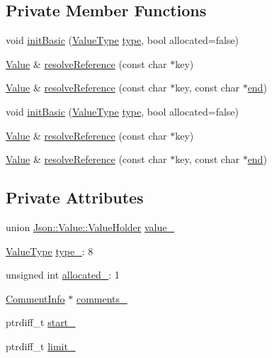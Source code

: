 \subsection*{Private Member Functions}
\begin{DoxyCompactItemize}
\item 
void \hyperlink{class_json_1_1_value_a32b86b71564157f40f880f5736be822a}{init\+Basic} (\hyperlink{namespace_json_a7d654b75c16a57007925868e38212b4e}{Value\+Type} \hyperlink{class_json_1_1_value_a8ce61157a011894f0252ceed232312de}{type}, bool allocated=false)
\item 
\hyperlink{class_json_1_1_value}{Value} \& \hyperlink{class_json_1_1_value_a9ff9cdae2c8f4155bab603d750b0b3f1}{resolve\+Reference} (const char $\ast$key)
\item 
\hyperlink{class_json_1_1_value}{Value} \& \hyperlink{class_json_1_1_value_a5f6b3aaf4f2e952a33dd823db008c333}{resolve\+Reference} (const char $\ast$key, const char $\ast$\hyperlink{class_json_1_1_value_a3e443cd0ef24f7e028b175e47ee045e0}{end})
\item 
void \hyperlink{class_json_1_1_value_a32b86b71564157f40f880f5736be822a}{init\+Basic} (\hyperlink{namespace_json_a7d654b75c16a57007925868e38212b4e}{Value\+Type} \hyperlink{class_json_1_1_value_a8ce61157a011894f0252ceed232312de}{type}, bool allocated=false)
\item 
\hyperlink{class_json_1_1_value}{Value} \& \hyperlink{class_json_1_1_value_a78817583bdc3cf28e0b8edfe74031a98}{resolve\+Reference} (const char $\ast$key)
\item 
\hyperlink{class_json_1_1_value}{Value} \& \hyperlink{class_json_1_1_value_a121c76136ac3255ad3de088b50652acb}{resolve\+Reference} (const char $\ast$key, const char $\ast$\hyperlink{class_json_1_1_value_a3e443cd0ef24f7e028b175e47ee045e0}{end})
\end{DoxyCompactItemize}
\subsection*{Private Attributes}
\begin{DoxyCompactItemize}
\item 
union \hyperlink{union_json_1_1_value_1_1_value_holder}{Json\+::\+Value\+::\+Value\+Holder} \hyperlink{class_json_1_1_value_a692277d820a4750e01354e16a465ecfe}{value\+\_\+}
\item 
\hyperlink{namespace_json_a7d654b75c16a57007925868e38212b4e}{Value\+Type} \hyperlink{class_json_1_1_value_abd222c2536dc88bf330dedcd076d2356}{type\+\_\+}\+: 8
\item 
unsigned int \hyperlink{class_json_1_1_value_ae0126c80dc4907aad94088553fc7632b}{allocated\+\_\+}\+: 1
\item 
\hyperlink{struct_json_1_1_value_1_1_comment_info}{Comment\+Info} $\ast$ \hyperlink{class_json_1_1_value_ac6b962f72746177719ed5754dd639d6f}{comments\+\_\+}
\item 
ptrdiff\+\_\+t \hyperlink{class_json_1_1_value_a1c3aeb0fa8fefe93776cb347c76a25a8}{start\+\_\+}
\item 
ptrdiff\+\_\+t \hyperlink{class_json_1_1_value_afe377e25f6d3b5b8ea7221c84f29412a}{limit\+\_\+}
\end{DoxyCompactItemize}
